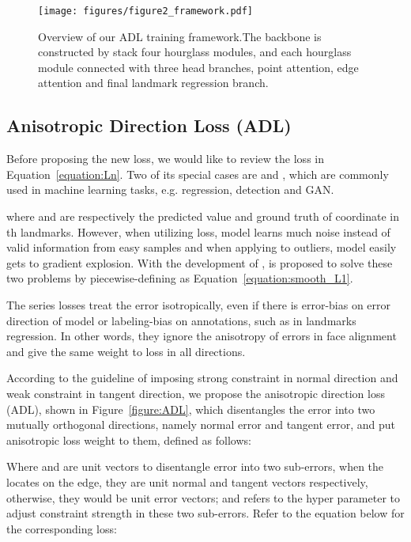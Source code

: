 \documentclass[10pt,twocolumn,letterpaper]{article}
\begin{document}
\begin{figure*}
\begin{center}
\texttt{[image: figures/figure2\_framework.pdf]}
\end{center}
   \caption{Overview of our ADL training framework.The backbone is constructed by stack four hourglass modules, and each hourglass module connected with three head branches, point attention, edge attention and final landmark regression branch.}
\label{figure:framework}
\end{figure*}

\subsection{Anisotropic Direction Loss (ADL)}

Before proposing the new loss, we would like to review the \emph{} loss in Equation~\ref{equation:Ln}. Two of its special cases are \emph{} and \emph{}, which are commonly used in machine learning tasks, e.g. regression, detection and GAN.



where  and  are respectively the predicted value and ground truth of coordinate in th landmarks. However, when utilizing \emph{} loss, model learns much noise instead of valid information from easy samples and when applying \emph{} to outliers, model easily gets to gradient explosion. With the development of \emph{}, {} is proposed to solve these two problems by piecewise-defining as Equation~\ref{equation:smooth_L1}.



The \emph{} series losses treat the error isotropically, even if there is error-bias on error direction of model or labeling-bias on annotations, such as in landmarks regression. In other words, they ignore the anisotropy of errors in face alignment and give the same weight to loss in all directions.

According to the guideline of imposing strong constraint in normal direction and weak constraint in tangent direction, we propose the anisotropic direction loss (ADL), shown in Figure~\ref{figure:ADL}, which disentangles the error into two mutually orthogonal directions, namely normal error and tangent error, and put anisotropic loss weight to them, defined as follows:



Where \emph{} and \emph{} are unit vectors to disentangle error into two sub-errors, when the \emph{} locates on the edge, they are unit normal and tangent vectors respectively, otherwise, they would be unit error vectors; and \emph{} refers to the hyper parameter to adjust constraint strength in these two sub-errors. Refer to the equation below for the corresponding {} loss:
\end{document}
